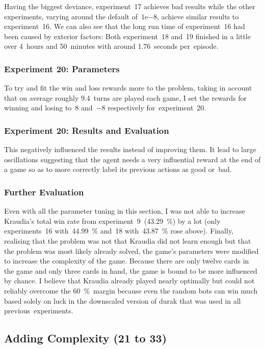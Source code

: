 \documentclass[a4paper,titlepage]{article}
\newcommand{\expn}[2]{{#1}\mathrm{e}{#2}}
\begin{document}
Having the biggest deviance, experiment~17 achieves bad results while the other experiments, varying around the default of~$\expn{1}{-8}$, achieve similar results to experiment~16. We can also see that the long run time of experiment~16 had been caused by exterior factors: Both experiment~18 and~19 finished in a little over 4~hours and 50~minutes with around 1.76~seconds per~episode.

\subsubsection*{Experiment 20: Parameters}

To try and fit the win and loss rewards more to the problem, taking in account that on average roughly 9.4~turns are played each game, I set the rewards for winning and losing to~8 and~$-8$ respectively for~experiment~20.

\subsubsection*{Experiment 20: Results and Evaluation}

This negatively influenced the results instead of improving them. It lead to large oscillations suggesting that the agent needs a very influential reward at the end of a game so as to more correctly label its previous actions as good or~bad.

\subsubsection*{Further Evaluation}

Even with all the parameter tuning in this section, I was not able to increase Kraudia's total win rate from experiment~9~(43.29~\%) by a lot (only experiments~16 with~44.99~\% and~18 with~43.87~\% rose above). Finally, realising that the problem was not that Kraudia did not learn enough but that the problem was most likely already solved, the game's parameters were modified to increase the complexity of the game. Because there are only twelve cards in the game and only three cards in hand, the game is bound to be more influenced by chance. I believe that Kraudia already played nearly optimally but could not reliably overcome the 60~\%~margin because even the random bots can win much based solely on luck in the downscaled version of durak that was used in all previous~experiments.

\subsection{Adding Complexity (21 to 33)}
\end{document}
